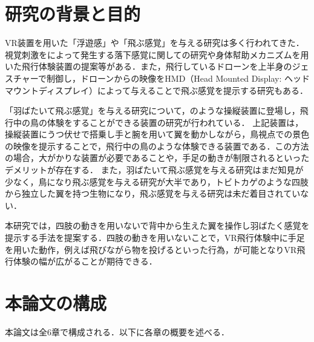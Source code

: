 \section{研究の背景と目的}

        VR装置を用いた「浮遊感」や「飛ぶ感覚」を与える研究は多く行われてきた．視覚刺激をによって発生する落下感覚に関しての研究\cite{奥川夏輝2017VR空間における視覚刺激によって発生する落下感覚の分析}や身体幇助メカニズムを用いた飛行体験装置の提案\cite{鈴木拓馬2014hmd}等がある．また，飛行しているドローンを上半身のジェスチャーで制御し，ドローンからの映像をHMD（Head Mounted Display: ヘッドマウントディスプレイ）によって与えることで飛ぶ感覚を提示する研究\cite{rognon2018flyjacket}もある．


        「羽ばたいて飛ぶ感覚」を与える研究について，のような操縦装置に登場し，飛行中の鳥の体験をすることができる装置の研究が行われている\cite{rheiner2014birdly}\cite{hypersuit}．
        上記装置は，操縦装置にうつ伏せで搭乗し手と腕を用いて翼を動かしながら，鳥視点での景色の映像を提示することで，飛行中の鳥のような体験できる装置である．この方法の場合，大がかりな装置が必要であることや，手足の動きが制限されるといったデメリットが存在する．
        また，羽ばたいて飛ぶ感覚を与える研究はまだ知見が少なく，鳥になり飛ぶ感覚を与える研究が大半であり，トビトカゲのような四肢から独立した翼を持つ生物になり，飛ぶ感覚を与える研究は未だ着目されていない．

        本研究では，四肢の動きを用いないで背中から生えた翼を操作し羽ばたく感覚を提示する手法を提案する．四肢の動きを用いないことで，VR飛行体験中に手足を用いた動作，例えば飛びながら物を投げるといった行為，が可能となりVR飛行体験の幅が広がることが期待できる．

\section{本論文の構成}
        
        本論文は全6章で構成される．以下に各章の概要を述べる．


